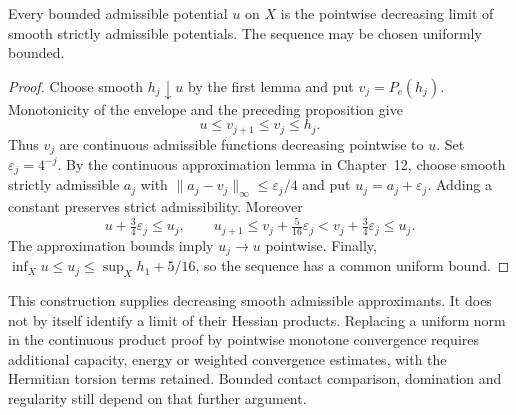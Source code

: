 \begin{theorem}\label{draft:607-bounded-decreasing-approximation}
Every bounded admissible potential $u$ on $X$ is the pointwise
decreasing limit of smooth strictly admissible potentials.
The sequence may be chosen uniformly bounded.
\end{theorem}
\begin{proof}
Choose smooth $h_j\downarrow u$ by the first lemma and put
$v_j=P_c(h_j)$. Monotonicity of the envelope and the preceding
proposition give
\[
 u\leq v_{j+1}\leq v_j\leq h_j.
\]
Thus $v_j$ are continuous admissible functions decreasing pointwise
to $u$. Set $\varepsilon_j=4^{-j}$. By the continuous approximation
lemma in Chapter~12, choose smooth strictly admissible $a_j$ with
$\|a_j-v_j\|_\infty\leq\varepsilon_j/4$ and put
$u_j=a_j+\varepsilon_j$. Adding a constant preserves strict
admissibility. Moreover
\[
 u+\tfrac34\varepsilon_j\leq u_j,
 \qquad
 u_{j+1}\leq v_j+\tfrac5{16}\varepsilon_j
                <v_j+\tfrac34\varepsilon_j\leq u_j.
\]
The approximation bounds imply $u_j\to u$ pointwise.
Finally, $\inf_X u\leq u_j\leq\sup_X h_1+5/16$, so the sequence
has a common uniform bound.
\end{proof}

This construction supplies decreasing smooth admissible approximants.
It does not by itself identify a limit of their Hessian products.
Replacing a uniform norm in the continuous product proof by pointwise
monotone convergence requires additional capacity, energy or weighted
convergence estimates, with the Hermitian torsion terms retained.
Bounded contact comparison, domination and regularity still depend on
that further argument.
